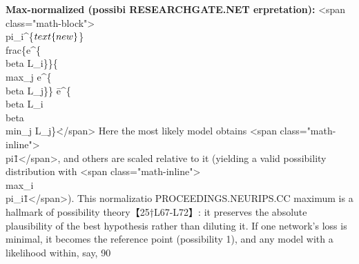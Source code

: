 \documentclass{article}
\begin{document}
\textbf{Max-normalized (possibi​
RESEARCHGATE.NET
erpretation):}
<span class="math-block">\\pi\_i^\{\(\\text\{new\}\)\} \= \\frac\{e^\{\-\\beta L\_i\}\}\{\\max\_j e^\{\-\\beta L\_j\}\} \= e^\{\-\\beta L\_i \+ \\beta \\min\_j L\_j\}\.</span>
Here the most likely model obtains <span class="math-inline">\\pi\=1</span>, and others are scaled relative to it (yielding a valid possibility distribution with <span class="math-inline">\\max\_i \\pi\_i\=1</span>). This normalizatio​
PROCEEDINGS.NEURIPS.CC
maximum is a hallmark of possibility theory【25†L67-L72】: it preserves the absolute plausibility of the best hypothesis rather than diluting it. If one network’s loss is minimal, it becomes the reference point (possibility 1), and any model with a likelihood within, say, 90%
\end{document}
